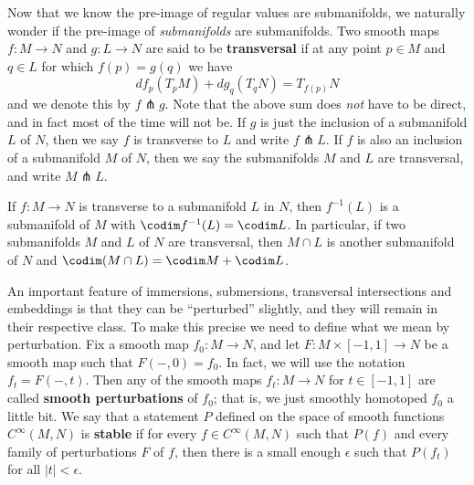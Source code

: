 Now that we know the pre-image of regular values are submanifolds, we naturally wonder if the pre-image of \emph{submanifolds} are submanifolds. Two smooth maps $f : M \rightarrow N$ and $g : L \rightarrow N$ are said to be \textbf{transversal} if at any point $p \in M$ and $q \in L$ for which $f(p)=g(q)$ we have
\[ df_{p}(T_p M) + dg_{q}(T_q N) = T_{f(p)} N \]
and we denote this by $f \pitchfork g$. Note that the above sum does \emph{not} have to be direct, and in fact most of the time will not be. If $g$ is just the inclusion of a submanifold $L$ of $N$, then we say $f$ is transverse to $L$ and write $f \pitchfork L$. If $f$ is also an inclusion of a submanifold $M$ of $N$, then we say the submanifolds $M$ and $L$ are transversal, and write $M \pitchfork L$.
\begin{prop}
\label{pre-image of submanifold under transversality}
If $f : M \rightarrow N$ is transverse to a submanifold $L$ in $N$, then $f^{-1}(L)$ is a submanifold of $M$ with $\codim f^{-1}(L) = \codim L$. In particular, if two submanifolds $M$ and $L$ of $N$ are transversal, then $M \cap L$ is another submanifold of $N$ and $\codim(M \cap L) = \codim M + \codim L$.
\end{prop}


An important feature of immersions, submersions, transversal intersections and embeddings is that they can be ``perturbed'' slightly, and they will remain in their respective class. To make this precise we need to define what we mean by perturbation. Fix a smooth map $f_0 : M \rightarrow N$, and let $F : M \times [-1,1] \rightarrow N$ be a smooth map such that $F(-,0) = f_0$. In fact, we will use the notation $f_t = F(-,t)$. Then any of the smooth maps $f_t : M \rightarrow N$ for $t \in [-1,1]$ are called \textbf{smooth perturbations} of $f_0$; that is, we just smoothly homotoped $f_0$ a little bit. We say that a statement $P$ defined on the space of smooth functions $C^\infty(M,N)$ is \textbf{stable} if for every $f \in C^\infty(M,N)$ such that $P(f)$ and every family of perturbations $F$ of $f$, then there is a small enough $\epsilon$ such that $P(f_t)$ for all $|t| < \epsilon$.

